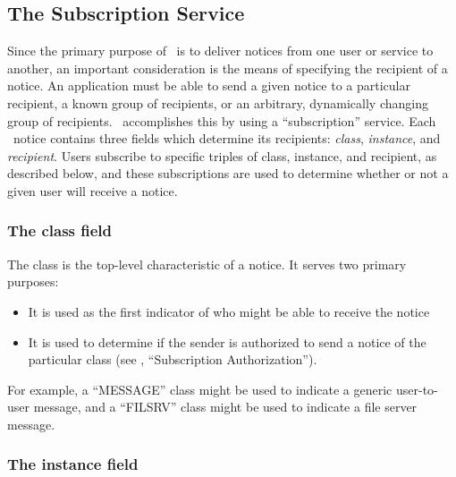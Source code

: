 %
\subsection{The Subscription Service}
\label{subscription}

Since the primary purpose of \Zephyr\ is to deliver notices from one
user or service to another, an important consideration is the means of
specifying the recipient of a notice.  An application must be able to
send a given notice to a particular recipient, a known group of
recipients, or an arbitrary, dynamically changing group of recipients.
\Zephyr\ accomplishes this by using a ``subscription'' service.  Each
\Zephyr\ notice contains three fields which determine its recipients:
{\em class\/}, {\em instance\/}, and {\em recipient\/}.  Users
subscribe to specific triples of class, instance, and recipient, as
described below, and these subscriptions are used to determine whether
or not a given user will receive a notice.

\subsubsection{The {\bf class} field}
\label{subscription-class}

The class is the top-level characteristic of a notice.  It serves two
primary purposes:

\begin{itemize}
\item It is used as the first indicator of who might be able to
receive the notice
\item It is used to determine if the sender is authorized to send a
notice of the particular class (see , 
``Subscription Authorization'').

\end{itemize}

For example, a ``MESSAGE'' class might be used to indicate a generic
user-to-user message, and a ``FILSRV'' class might be used to indicate
a file server message.

\subsubsection{The {\bf instance} field}
\label{subscription-instance}

